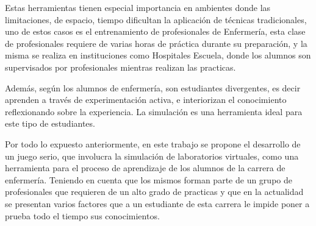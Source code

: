 Estas herramientas tienen especial importancia en ambientes donde las limitaciones,
de espacio, tiempo dificultan la aplicación de técnicas tradicionales, uno de
estos casos es el entrenamiento de profesionales de Enfermería, esta clase de
profesionales requiere de varias horas de práctica durante su preparación, y la
misma se realiza en instituciones como Hospitales Escuela, donde los alumnos
son supervisados por profesionales mientras realizan las practicas.

Además, según \cite{humphreys2013developing} los alumnos de enfermería, son
estudiantes divergentes, es decir aprenden a través de experimentación activa, e
interiorizan el conocimiento reflexionando sobre la experiencia. La simulación
es una herramienta ideal para este tipo de
estudiantes\cite{humphreys2013developing}.

Por todo lo expuesto anteriormente, en este trabajo se propone el desarrollo de
un juego serio, que involucra la simulación de laboratorios virtuales, como una
herramienta para el proceso de aprendizaje de los alumnos de la carrera de
enfermería. Teniendo en cuenta que los mismos forman parte de un grupo de
profesionales que requieren de un alto grado de practicas y que en la actualidad
se presentan varios factores que a un estudiante de esta carrera le impide poner
a prueba todo el tiempo sus conocimientos.




